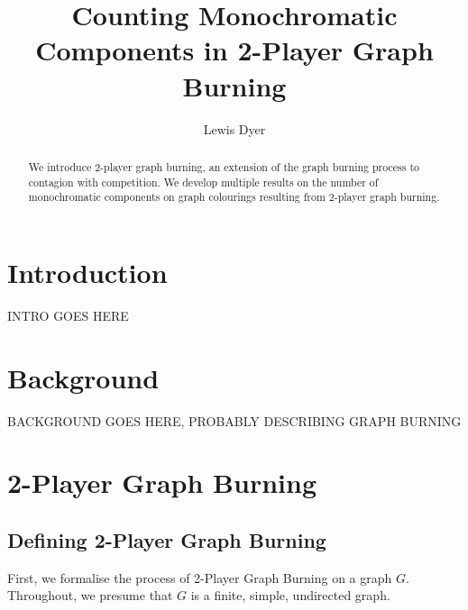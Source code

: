\documentclass{mpaper}
\begin{document}
\title{Counting Monochromatic Components in 2-Player Graph Burning}
\author{Lewis Dyer}

\maketitle

\begin{abstract}
We introduce 2-player graph burning, an extension of the graph burning process to contagion with competition. We develop multiple results on the number of monochromatic components on graph colourings resulting from 2-player graph burning.
\end{abstract}

\section{Introduction}

INTRO GOES HERE

\section{Background}

BACKGROUND GOES HERE, PROBABLY DESCRIBING GRAPH BURNING


\section{2-Player Graph Burning}

\subsection{Defining 2-Player Graph Burning}

First, we formalise the process of 2-Player Graph Burning on a graph $G$. Throughout, we presume that $G$ is a finite, simple, undirected graph.
\end{document}

